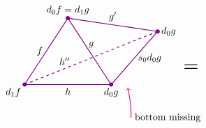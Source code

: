         \begin{equation*}
            \begin{tikzpicture}[
                scale=1.2,
                thick,
                color=violet, %
                every node/.style={text=black},
                dot/.style={circle, fill=violet, inner sep=1.5pt, outer sep=0pt}
            ]

    
                \coordinate (L0) at (0,0);       %
                \coordinate (L1) at (1.3, 2.0);  %
                \coordinate (L2) at (2.6, 0);    %
                \coordinate (L3) at (4.0, 1.6);  %

                \draw (L0) -- node[left] {$f$} (L1);
                \draw (L0) -- node[below] {$h$} (L2);
                \draw (L1) -- node[right, pos=0.4] {$g$} (L2);
                \draw (L1) -- node[above] {$g'$} (L3);
                \draw (L2) -- node[right] {$s_0 d_0 g$} (L3);
    
                \draw[dashed] (L0) -- node[above, pos=0.3] {$h''$} (L3);

                \node[dot] at (L0) {};
                \node[dot] at (L1) {};
                \node[dot] at (L2) {};
                \node[dot] at (L3) {};

                \node[below left] at (L0) {$d_1 f$};
                \node[above] at (L1) {$d_0 f = d_1 g$};
                \node[below] at (L2) {$d_0 g$};
                \node[right] at (L3) {$d_0 g$};

                \draw[->, magenta, thick] (3.2, -1.0) node[right] {bottom missing} .. controls (3.2, -0.6) .. (3.1, -0.1);


                \node[scale=2] at (5.0, 0.5) {=};



                \begin{scope}[shift={(5.8, 1.0)}]
                    \coordinate (H1_0) at (0, 0);
                    \coordinate (H1_1) at (1.1, 1.5);
                    \coordinate (H1_3) at (3.5, 1.2); %


\end{scope}
\end{tikzpicture}
\end{equation*}
